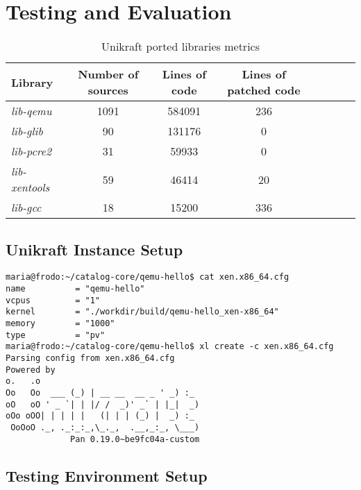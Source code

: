 \chapter{Testing and Evaluation}
\label{chapter:testing-evaluation}

\begin{center}
\begin{table}[htb]
  \caption{Unikraft ported libraries metrics}
  \begin{tabular}{l*{6}{c}r}
    Library & Number of sources & Lines of code & Lines of patched code \\
    \hline
    \textit{lib-qemu} & 1091 & 584091 & 236  \\
    \textit{lib-glib} & 90 & 131176 & 0  \\
    \textit{lib-pcre2} & 31 & 59933 & 0 \\
    \textit{lib-xentools} & 59 & 46414 & 20 \\
    \textit{lib-gcc} & 18 & 15200 & 336 \\
  \end{tabular}
  \label{table:reports}
\end{table}
\end{center}


\section{Unikraft Instance Setup}
\label{sec:unikraft-instance-setup}

\lstset{language=make,caption=Running Unikraft command,label=lst:running-unikraft}
\begin{lstlisting}
maria@frodo:~/catalog-core/qemu-hello$ cat xen.x86_64.cfg 
name          = "qemu-hello"
vcpus         = "1"
kernel        = "./workdir/build/qemu-hello_xen-x86_64"
memory        = "1000"
type          = "pv"
maria@frodo:~/catalog-core/qemu-hello$ xl create -c xen.x86_64.cfg
Parsing config from xen.x86_64.cfg
Powered by
o.   .o
Oo   Oo  ___ (_) | __ __  __ _ ' _) :_
oO   oO ' _ `| | |/ /  _)' _` | |_|  _)
oOo oOO| | | | |   (| | | (_) |  _) :_
 OoOoO ._, ._:_:_,\_._,  .__,_:_, \___)
             Pan 0.19.0~be9fc04a-custom
\end{lstlisting}

\section{Testing Environment Setup}
\label{sec:testing-environment-setup}

